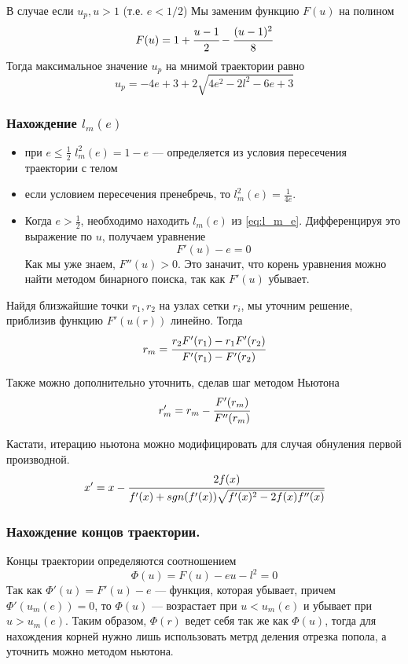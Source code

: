 	В случае если $u_p, u > 1$ (т.е. $e < 1/2$) Мы заменим функцию $F(u)$ на полином
	\begin{equation*}
		F(u) = 1 + \cfrac{u-1}{2}-\cfrac{(u-1)^2}{8}
	\end{equation*}
	Тогда максимальное значение $u_p$ на мнимой траектории равно
	\begin{equation*}
		u_p = -4e + 3 + 2\sqrt{4e^2 - 2l^2 - 6e + 3}
	\end{equation*}
	
	
	
	\subsubsection{Нахождение $l_m(e)$}
	\begin{itemize}
		\item при $e \le \frac{1}{2}$ $l_m^2(e) = 1-e$ --- определяется из условия пересечения траектории с телом
		\item если условием пересечения пренебречь, то $l_m^2(e) = \frac{1}{4e}$. 
		\item Когда $e > \frac{1}{2}$, необходимо находить $l_m(e)$ из \ref{eq:l_m_e}.
		Дифференцируя это выражение по $u$, получаем уравнение 
		\begin{equation*}
			F'(u) - e = 0
		\end{equation*}
		Как мы уже знаем, $F''(u) > 0$. Это заначит, что корень уравнения можно найти методом бинарного поиска, так как $F'(u)$ убывает.
	
	\end{itemize}
	Найдя близжайшие точки $r_1, r_2$ на узлах сетки $r_i$, мы уточним решение, приблизив функцию $F'(u(r))$ линейно. Тогда 
	\begin{equation*}
		r_m = \cfrac{r_2 F'(r_1) - r_1 F'(r_2)}{F'(r_1)-F'(r_2)}
	\end{equation*}
	
	Также можно дополнительно уточнить, сделав шаг методом Ньютона
	\begin{equation*}
		r'_m = r_m - \cfrac{F'(r_m)}{F''(r_m)}
	\end{equation*}
	
	Кастати, итерацию ньютона можно модифицировать для случая обнуления первой производной.
	\begin{equation*}
		x' = x - \cfrac{2f(x)}
		{f'(x) +sgn(f'(x))\sqrt{f'(x)^2 - 2f(x)f''(x)} }
	\end{equation*}
		
	\subsubsection{Нахождение концов траектории.}
	Концы траектории определяются соотношением
	\begin{equation*}
		\Phi(u) = F(u) - eu-l^2=0
	\end{equation*}
	Так как $\Phi'(u) = F'(u) - e$ --- функция, которая убывает, причем $\Phi'(u_m(e)) = 0$, то $\Phi(u)$ --- возрастает при $u < u_m(e)$ и убывает при $u > u_m(e)$.
	Таким образом, $\Phi(r)$ ведет себя так же как $\Phi(u)$, тогда для нахождения корней нужно лишь использовать метрд деления отрезка попола, а уточнить можно методом ньютона. 
	
